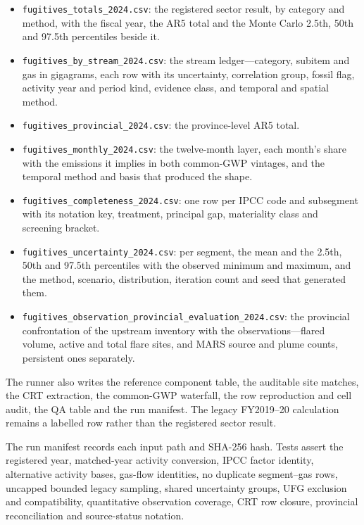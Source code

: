 \begin{itemize}\itemsep2pt
\item \texttt{fugitives\_totals\_2024.csv}: the registered sector result, by category and
  method, with the fiscal year, the AR5 total and the Monte Carlo 2.5th, 50th and 97.5th
  percentiles beside it.
\item \texttt{fugitives\_\allowbreak by\_\allowbreak stream\_\allowbreak 2024.csv}: the stream ledger---category,
  subitem and gas in gigagrams, each row with its uncertainty, correlation group,
  fossil flag, activity year and period kind, evidence class, and temporal and spatial method.
\item \texttt{fugitives\_provincial\_2024.csv}: the province-level AR5 total.
\item \texttt{fugitives\_monthly\_2024.csv}: the twelve-month layer, each month's share with
  the emissions it implies in both common-GWP vintages, and the temporal method and basis that
  produced the shape.
\item \texttt{fugitives\_\allowbreak completeness\_\allowbreak 2024.csv}: one row per IPCC code and subsegment
  with its notation key, treatment, principal gap, materiality class and screening bracket.
\item \texttt{fugitives\_\allowbreak uncertainty\_\allowbreak 2024.csv}: per segment, the mean and the 2.5th,
  50th and 97.5th percentiles with the observed minimum and maximum, and the method,
  scenario, distribution, iteration count and seed that generated them.
\item \texttt{fugitives\_\allowbreak observation\_\allowbreak provincial\_\allowbreak evaluation\_\allowbreak 2024.csv}: the
  provincial confrontation of the upstream inventory with the observations---flared volume,
  active and total flare sites, and MARS source and plume counts, persistent ones separately.
\end{itemize}

The runner also writes the reference component table, the auditable site matches, the CRT
extraction, the common-GWP waterfall, the row reproduction and cell audit, the QA table and the
run manifest. The legacy FY2019--20 calculation remains a labelled row rather than the
registered sector result.

The run manifest records each input path and SHA-256 hash. Tests assert the registered year,
matched-year activity conversion, IPCC factor identity, alternative activity bases, gas-flow
identities, no duplicate segment--gas rows, uncapped bounded legacy sampling, shared uncertainty
groups, UFG exclusion and compatibility, quantitative observation coverage, CRT row closure,
provincial reconciliation and source-status notation.

